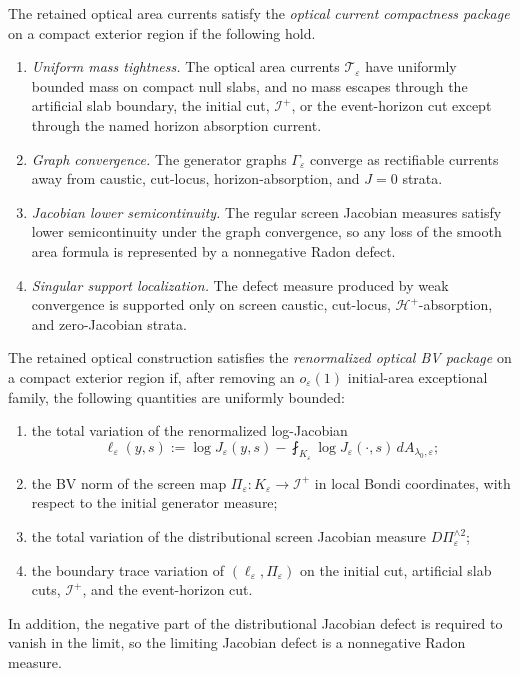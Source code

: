\begin{definition}\label{def:OpticalCurrentCompactnessPackage}
The retained optical area currents satisfy the \emph{optical current compactness package} on a compact exterior region if the following hold.
\begin{enumerate}
    \item \emph{Uniform mass tightness.} The optical area currents $\mathcal T_\varepsilon$ have uniformly bounded mass on compact null slabs, and no mass escapes through the artificial slab boundary, the initial cut, $\mathscr I^+$, or the event-horizon cut except through the named horizon absorption current.
    \item \emph{Graph convergence.} The generator graphs $\Gamma_\varepsilon$ converge as rectifiable currents away from caustic, cut-locus, horizon-absorption, and $J=0$ strata.
    \item \emph{Jacobian lower semicontinuity.} The regular screen Jacobian measures satisfy lower semicontinuity under the graph convergence, so any loss of the smooth area formula is represented by a nonnegative Radon defect.
    \item \emph{Singular support localization.} The defect measure produced by weak convergence is supported only on screen caustic, cut-locus, $\mathcal H^+$-absorption, and zero-Jacobian strata.
\end{enumerate}
\end{definition}

\begin{definition}\label{def:RenormalizedOpticalBVPackage}
The retained optical construction satisfies the \emph{renormalized optical BV package} on a compact exterior region if, after removing an $o_\varepsilon(1)$ initial-area exceptional family, the following quantities are uniformly bounded:
\begin{enumerate}
    \item the total variation of the renormalized log-Jacobian
    \[
        \ell_\varepsilon(y,s)
        :=
        \log J_\varepsilon(y,s)
        -
        \fint_{K_\varepsilon}\log J_\varepsilon(\cdot,s)\,dA_{\lambda_0,\varepsilon};
    \]
    \item the BV norm of the screen map $\Pi_\varepsilon:K_\varepsilon\to\mathscr I^+$ in local Bondi coordinates, with respect to the initial generator measure;
    \item the total variation of the distributional screen Jacobian measure $D\Pi_\varepsilon^{\wedge 2}$;
    \item the boundary trace variation of $(\ell_\varepsilon,\Pi_\varepsilon)$ on the initial cut, artificial slab cuts, $\mathscr I^+$, and the event-horizon cut.
\end{enumerate}
In addition, the negative part of the distributional Jacobian defect is required to vanish in the limit, so the limiting Jacobian defect is a nonnegative Radon measure.
\end{definition}

